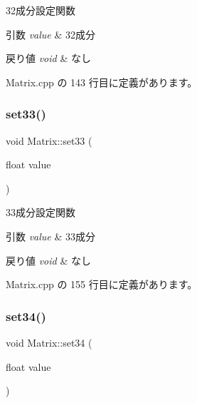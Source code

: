 32成分設定関数 


\begin{DoxyParams}{引数}
{\em value} & 32成分 \\
\hline
\end{DoxyParams}

\begin{DoxyRetVals}{戻り値}
{\em void} & なし \\
\hline
\end{DoxyRetVals}


 Matrix.\+cpp の 143 行目に定義があります。

\mbox{\label{class_matrix_ae4817d20e03fe01105b6e4957d49060e}} 
\subsubsection{\texorpdfstring{set33()}{set33()}}
{\footnotesize\ttfamily void Matrix\+::set33 (\begin{DoxyParamCaption}\item[{float}]{value }\end{DoxyParamCaption})}



33成分設定関数 


\begin{DoxyParams}{引数}
{\em value} & 33成分 \\
\hline
\end{DoxyParams}

\begin{DoxyRetVals}{戻り値}
{\em void} & なし \\
\hline
\end{DoxyRetVals}


 Matrix.\+cpp の 155 行目に定義があります。

\mbox{\label{class_matrix_a7114f1252d78581637cbb5b06cff9b33}} 
\subsubsection{\texorpdfstring{set34()}{set34()}}
{\footnotesize\ttfamily void Matrix\+::set34 (\begin{DoxyParamCaption}\item[{float}]{value }\end{DoxyParamCaption})}



